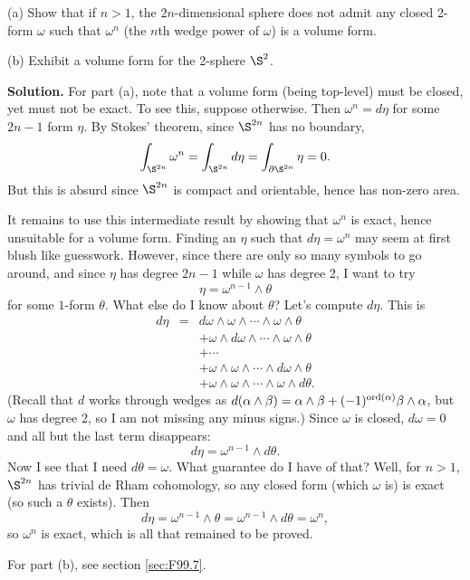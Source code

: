 \documentclass[10pt]{article}
\numberwithin{equation}{subsection}
\begin{document}
(a) Show that if $n>1$, the $2n$-dimensional sphere does not admit any
closed 2-form $\omega$ such that $\omega^n$ (the $n$th wedge power of $\omega$)
is a volume form.

(b) Exhibit a volume form for the 2-sphere $\S^2$.

\textbf{Solution.}  For part (a), note that a volume form (being top-level)
must be closed, yet must not be exact.  To see this, suppose otherwise.  Then
$\omega^n=d\eta$ for some $2n-1$ form $\eta$.  By Stokes' theorem, since
$\S^{2n}$ has no boundary,
$$
	\int_{\S^{2n}} \omega^n =
	\int_{\S^{2n}} d\eta =
	\int_{\D\S^{2n}} \eta = 0.
$$
But this is absurd since $\S^{2n}$ is compact and orientable, hence has
non-zero area.

It remains to use this intermediate result by showing that $\omega^n$ is exact,
hence unsuitable for a volume form.  Finding an $\eta$ such that
$d\eta=\omega^n$ may seem at first blush like guesswork.  However, since there
are only so many symbols to go around, and since $\eta$ has degree $2n-1$ while
$\omega$ has degree 2, I want to try
$$
	\eta=\omega^{n-1}\wedge \theta
$$
for some $1$-form $\theta$.  What else do I know about $\theta$?  Let's compute
$d\eta$.  This is
\begin{eqnarray*}
	d\eta &=& d\omega \wedge \omega \wedge \cdots \wedge \omega\wedge\theta \\
	&&+ \omega \wedge d\omega \wedge \cdots \wedge \omega\wedge\theta \\
	&&+ \cdots \\
	&&+ \omega \wedge \omega \wedge \cdots \wedge d\omega\wedge\theta \\
	&&+ \omega \wedge \omega \wedge \cdots \wedge \omega\wedge d\theta.
\end{eqnarray*}
(Recall that $d$ works through wedges as $d(\alpha\wedge\beta)
=\alpha\wedge\beta + (-1)^{\mathrm{ord}(\alpha)}\beta\wedge\alpha$, but $\omega$ has
degree 2, so I am not missing any minus signs.) Since $\omega$ is closed,
$d\omega=0$ and all but the last term disappears:
$$
	d\eta = \omega^{n-1} \wedge d\theta.
$$
Now I see that I need $d\theta=\omega$.  What guarantee do I have of that?
Well, for $n>1$, $\S^{2n}$ has trivial de Rham cohomology, so any closed
form (which $\omega$ is) is exact (so such a $\theta$ exists).
Then
$$
	d\eta = \omega^{n-1}\wedge\theta = \omega^{n-1}\wedge d\theta = \omega^n,
$$
so $\omega^n$ is exact, which is all that remained to be proved.

For part (b), see section \ref{sec:F99.7}.
\end{document}
